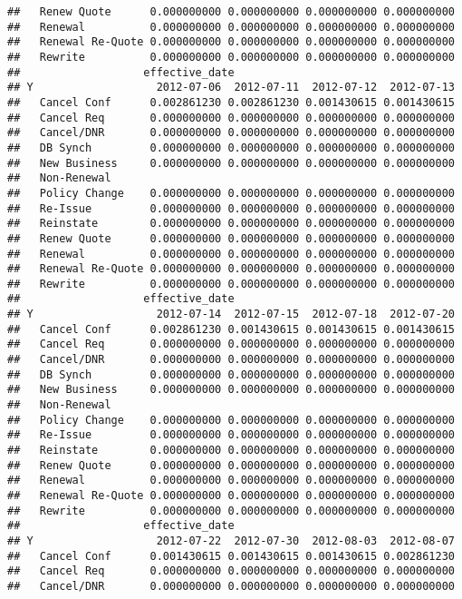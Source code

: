 \documentclass[]{article}
\begin{document}
\begin{verbatim}
##   Renew Quote      0.000000000 0.000000000 0.000000000 0.000000000
##   Renewal          0.000000000 0.000000000 0.000000000 0.000000000
##   Renewal Re-Quote 0.000000000 0.000000000 0.000000000 0.000000000
##   Rewrite          0.000000000 0.000000000 0.000000000 0.000000000
##                   effective_date
## Y                   2012-07-06  2012-07-11  2012-07-12  2012-07-13
##   Cancel Conf      0.002861230 0.002861230 0.001430615 0.001430615
##   Cancel Req       0.000000000 0.000000000 0.000000000 0.000000000
##   Cancel/DNR       0.000000000 0.000000000 0.000000000 0.000000000
##   DB Synch         0.000000000 0.000000000 0.000000000 0.000000000
##   New Business     0.000000000 0.000000000 0.000000000 0.000000000
##   Non-Renewal                                                     
##   Policy Change    0.000000000 0.000000000 0.000000000 0.000000000
##   Re-Issue         0.000000000 0.000000000 0.000000000 0.000000000
##   Reinstate        0.000000000 0.000000000 0.000000000 0.000000000
##   Renew Quote      0.000000000 0.000000000 0.000000000 0.000000000
##   Renewal          0.000000000 0.000000000 0.000000000 0.000000000
##   Renewal Re-Quote 0.000000000 0.000000000 0.000000000 0.000000000
##   Rewrite          0.000000000 0.000000000 0.000000000 0.000000000
##                   effective_date
## Y                   2012-07-14  2012-07-15  2012-07-18  2012-07-20
##   Cancel Conf      0.002861230 0.001430615 0.001430615 0.001430615
##   Cancel Req       0.000000000 0.000000000 0.000000000 0.000000000
##   Cancel/DNR       0.000000000 0.000000000 0.000000000 0.000000000
##   DB Synch         0.000000000 0.000000000 0.000000000 0.000000000
##   New Business     0.000000000 0.000000000 0.000000000 0.000000000
##   Non-Renewal                                                     
##   Policy Change    0.000000000 0.000000000 0.000000000 0.000000000
##   Re-Issue         0.000000000 0.000000000 0.000000000 0.000000000
##   Reinstate        0.000000000 0.000000000 0.000000000 0.000000000
##   Renew Quote      0.000000000 0.000000000 0.000000000 0.000000000
##   Renewal          0.000000000 0.000000000 0.000000000 0.000000000
##   Renewal Re-Quote 0.000000000 0.000000000 0.000000000 0.000000000
##   Rewrite          0.000000000 0.000000000 0.000000000 0.000000000
##                   effective_date
## Y                   2012-07-22  2012-07-30  2012-08-03  2012-08-07
##   Cancel Conf      0.001430615 0.001430615 0.001430615 0.002861230
##   Cancel Req       0.000000000 0.000000000 0.000000000 0.000000000
##   Cancel/DNR       0.000000000 0.000000000 0.000000000 0.000000000

\end{verbatim}
\end{document}
